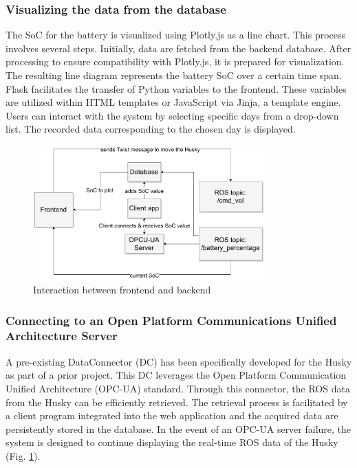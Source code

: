 \documentclass[conference]{IEEEtran}
\begin{document}
\subsubsection{Visualizing the data from the database}
The SoC for the battery is visualized using Plotly.js as a line chart. This process involves several steps. Initially, data are fetched from the backend database. After processing to ensure compatibility with Plotly.js, it is prepared for visualization. The resulting line diagram represents the battery SoC over a certain time span. Flask facilitates the transfer of Python variables to the frontend. 
These variables are utilized within HTML templates or JavaScript via Jinja, a template engine. Users can interact with the system by selecting specific days from a drop-down list. The recorded data corresponding to the chosen day is displayed.
\begin{figure}[tp]
    \centerline{\includegraphics[width=8.9cm]{Pictures/backfrontbig.pdf}}
    \caption{Interaction between frontend and backend}
    \label{fig:backfront}
\end{figure}
\subsubsection{Connecting to an Open Platform Communications Unified Architecture Server}
A pre-existing DataConnector (DC) has been specifically developed for the Husky as part of a prior project. This DC leverages the Open Platform Communication Unified Architecture \cite{opcua} (OPC-UA) standard. Through this connector, the ROS data from the Husky can be efficiently retrieved. The retrieval process is facilitated by a client program integrated into the web application and the acquired data are persistently stored in the database. 
In the event of an OPC-UA server failure, the system is designed to continue displaying the real-time ROS data of the Husky (Fig. \ref{fig:backfront}).
\end{document}
